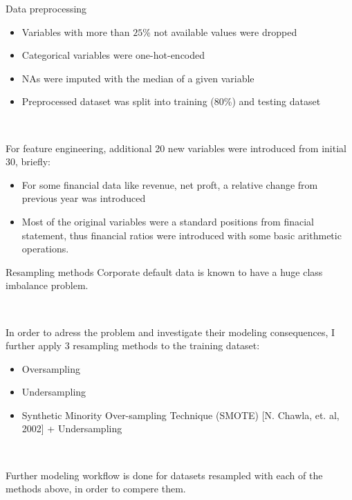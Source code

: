 \documentclass{beamer}
\begin{document}
\begin{frame}{Data preprocessing}

\begin{itemize}
\item Variables with more than $25$\% not available values were dropped
\item Categorical variables were one-hot-encoded
\item NAs were imputed with the median of a given variable
\item Preprocessed dataset was split into training (80\%) and testing dataset 

\end{itemize}

\

For feature engineering, additional 20 new variables were introduced from initial 30, briefly:

\begin{itemize}
\item For some financial data like revenue, net proft, a relative change from previous year was introduced
\item Most of the original variables were a standard positions from finacial statement, thus financial ratios were introduced with some basic arithmetic operations.

\end{itemize} 

\end{frame}

\begin{frame}{Resampling methods}
Corporate default data is known to have a huge class imbalance problem. 

\

In order to adress the problem and investigate their modeling consequences, I further apply 3 resampling methods to the training dataset:

\begin{itemize}
\item Oversampling
\item Undersampling
\item Synthetic Minority Over-sampling Technique (SMOTE) [N. Chawla, et. al, 2002] + Undersampling 
\end{itemize}

\

Further modeling workflow is done for datasets resampled with each of the methods above, in order to compere them.
\end{frame}
\end{document}
